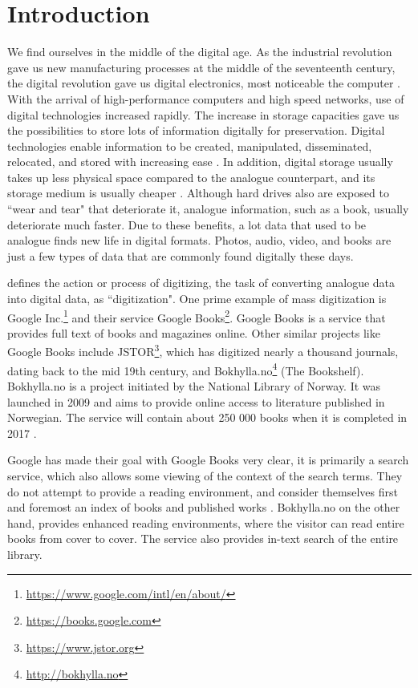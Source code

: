 
\chapter{Introduction}
\label{ch:introduction}
We find ourselves in the middle of the digital age. As the industrial revolution gave us new manufacturing processes at the middle of the seventeenth century, the digital revolution gave us digital electronics, most noticeable the computer \citep{freeman2001time}. With the arrival of high-performance computers and high speed networks, use of digital technologies increased rapidly. The increase in storage capacities gave us the possibilities to store lots of information digitally for preservation. Digital technologies enable information to be created, manipulated, disseminated, relocated, and stored with increasing ease \citep{lee2002state}. In addition, digital storage usually takes up less physical space compared to the analogue counterpart, and its storage medium is usually cheaper \citep{morris2003evolution}. Although hard drives also are exposed to ``wear and tear" that deteriorate it, analogue information, such as a book, usually deteriorate much faster. Due to these benefits, a lot data that used to be analogue finds new life in digital formats. Photos, audio, video, and books are just a few types of data that are commonly found digitally these days.

\citep{misc-oed-digitization} defines the action or process of digitizing, the task of converting analogue data into digital data, as ``digitization". One prime example of mass digitization is Google Inc.\footnote{\url{https://www.google.com/intl/en/about/}} and their service Google Books\footnote{\url{https://books.google.com}}. Google Books is a service that provides full text of books and magazines online. Other similar projects like Google Books include JSTOR\footnote{\url{https://www.jstor.org}}, which has digitized nearly a thousand journals, dating back to the mid 19th century, and Bokhylla.no\footnote{\url{http://bokhylla.no}} (The Bookshelf). Bokhylla.no is a project initiated by the National Library of Norway. It was launched in 2009 and aims to provide online access to literature published in Norwegian. The service will contain about 250 000 books when it is completed in 2017 \citep{misc-nb-digial-library}.

Google has made their goal with Google Books very clear, it is primarily a search service, which also allows some viewing of the context of the search terms. They do not attempt to provide a reading environment, and consider themselves first and foremost an index of books and published works \citep{coyle2006mass}. Bokhylla.no on the other hand, provides enhanced reading environments, where the visitor can read entire books from cover to cover. The service also provides in-text search of the entire library. 

